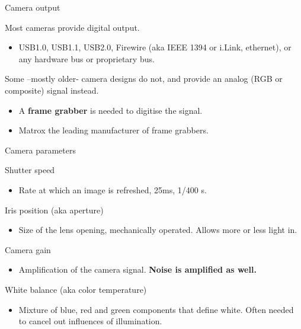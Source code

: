 \documentclass[compress]{beamer}
\begin{document}
\begin{frame}{Camera output}

    Most cameras provide digital output.

    \begin{itemize}

        \item
              USB1.0, USB1.1, USB2.0, Firewire (aka IEEE 1394 or i.Link, ethernet),
              or any hardware bus or proprietary bus.
    \end{itemize}

    Some --mostly older- camera designs do not, and provide an analog (RGB
    or composite) signal instead.

    \begin{itemize}

        \item
              A \textbf{frame grabber} is needed to digitise the signal.
        \item
              Matrox the leading manufacturer of frame grabbers.
    \end{itemize}

\end{frame}

\begin{frame}{Camera parameters}

    Shutter speed

    \begin{itemize}

        \item
              Rate at which an image is refreshed, \eg 25ms, 1/400 s.
    \end{itemize}

    Iris position (aka aperture)

    \begin{itemize}

        \item
              Size of the lens opening, mechanically operated. Allows more or less
              light in.
    \end{itemize}

    Camera gain

    \begin{itemize}

        \item
              Amplification of the camera signal. \textbf{Noise is amplified as
              well.}
    \end{itemize}

    White balance (aka color temperature)

    \begin{itemize}

        \item
              Mixture of blue, red and green components that define white. Often
              needed to cancel out influences of illumination.
    \end{itemize}

\end{frame}
\end{document}
